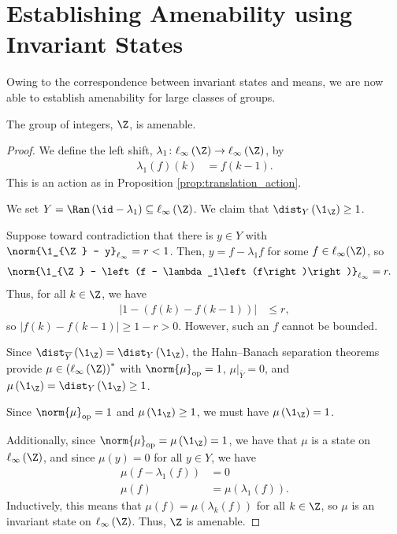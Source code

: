 \section{Establishing Amenability using Invariant States}\label{sec:amenability_invariant_states}%
Owing to the correspondence between invariant states and means, we are now able to establish amenability for large classes of groups.
\begin{proposition}
  The group of integers, $\Z$, is amenable.
\end{proposition}
\begin{proof}
  We define the left shift, $\lambda_1\colon \ell_{\infty}\left(\Z\right) \rightarrow \ell_{\infty}\left(\Z\right)$, by
  \begin{align*}
    \lambda_1\left(f\right)\left(k\right) &= f\left(k-1\right).
  \end{align*}
  This is an action as in Proposition \ref{prop:translation_action}. \newline

  We set $Y = \Ran\left(\id - \lambda_1\right)\subseteq \ell_{\infty}\left(\Z\right)$. We claim that $\dist_{Y}\left(\1_{\Z}\right) \geq 1$.\newline

  Suppose toward contradiction that there is $y\in Y$ with $\norm{\1_{\Z} - y}_{\ell_{\infty}} = r < 1$. Then, $y = f - \lambda_1 f$ for some $f\in \ell_{\infty}(\Z)$, so
  \begin{align*}
    \norm{\1_{\Z} - \left(f - \lambda_1\left(f\right)\right)}_{\ell_{\infty}} &= r.
  \end{align*}
  Thus, for all $k\in\Z$, we have
  \begin{align*}
    \left\vert 1 - \left(f(k) - f(k-1)\right) \right\vert &\leq r,
  \end{align*}
  so $\left\vert f(k) - f\left(k-1\right) \right\vert \geq 1-r > 0$. However, such an $f$ cannot be bounded.\newline

  Since $\dist_{\overline{Y}}\left(\1_{\Z}\right) = \dist_{Y}\left(\1_{\Z}\right)$, the Hahn--Banach separation theorems provide $\mu\in \left(\ell_{\infty}\left(\Z\right)\right)^{\ast}$ with $\norm{\mu}_{\op} = 1$, $\mu|_{\overline{Y}} = 0$, and $\mu\left(\1_{\Z}\right) = \dist_{Y}\left(\1_{\Z}\right) \geq 1$.\newline

  Since $\norm{\mu}_{\op} = 1$ and $\mu\left(\1_{\Z}\right) \geq 1$, we must have $\mu\left(\1_{\Z}\right) = 1$.\newline

  Additionally, since $\norm{\mu}_{\op} = \mu\left(\1_{\Z}\right) = 1$, we have that $\mu$ is a state on $\ell_{\infty}\left(\Z\right)$, and since $\mu\left(y\right) = 0$ for all $y\in Y$, we have
  \begin{align*}
    \mu\left(f - \lambda_1\left(f\right)\right) &= 0\\
    \mu\left(f\right) &= \mu\left(\lambda_1\left(f\right)\right).
  \end{align*}
  Inductively, this means that $\mu\left(f\right) = \mu\left(\lambda_k\left(f\right)\right)$ for all $k\in \Z$, so $\mu$ is an invariant state on $\ell_{\infty}\left(\Z\right)$. Thus, $\Z$ is amenable.
\end{proof}
